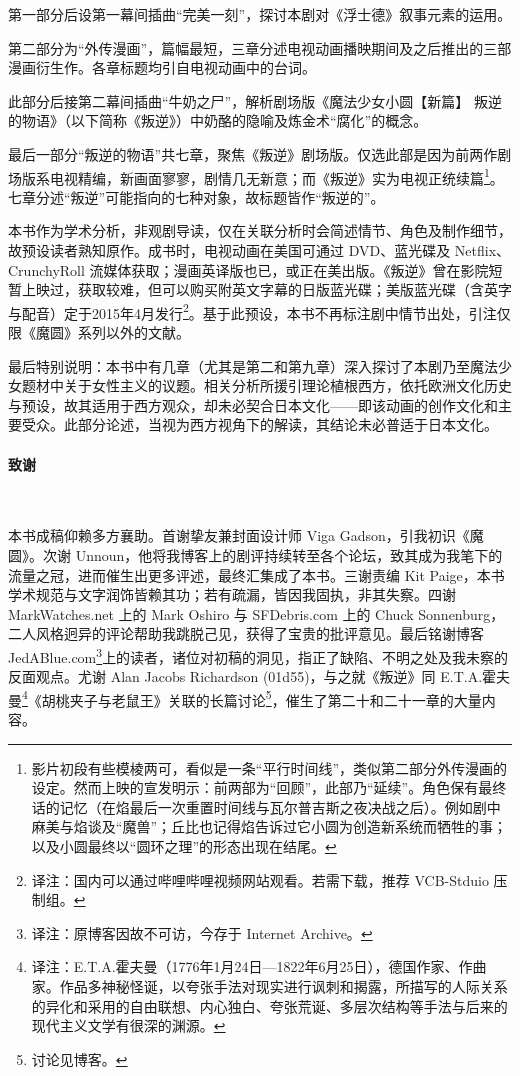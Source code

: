 第一部分后设第一幕间插曲“完美一刻”，探讨本剧对《浮士德》叙事元素的运用。

第二部分为“外传漫画”，篇幅最短，三章分述电视动画播映期间及之后推出的三部漫画衍生作。各章标题均引自电视动画中的台词。

此部分后接第二幕间插曲“牛奶之尸”，解析剧场版《魔法少女小圆【新篇】 叛逆的物语》（以下简称《叛逆》）中奶酪的隐喻及炼金术“腐化”的概念。

最后一部分“叛逆的物语”共七章，聚焦《叛逆》剧场版。仅选此部是因为前两作剧场版系电视精编，新画面寥寥，剧情几无新意；而《叛逆》实为电视正统续篇\footnote{影片初段有些模棱两可，看似是一条“平行时间线”，类似第二部分外传漫画的设定。然而上映的宣发明示：前两部为“回顾”，此部乃“延续”。角色保有最终话的记忆（在焰最后一次重置时间线与瓦尔普吉斯之夜决战之后）。例如剧中麻美与焰谈及“魔兽”；丘比也记得焰告诉过它小圆为创造新系统而牺牲的事；以及小圆最终以“圆环之理”的形态出现在结尾。}\cite{ref8}。七章分述“叛逆”可能指向的七种对象，故标题皆作“叛逆的\underline{\makebox[1cm]{}}”。

本书作为学术分析，非观剧导读，仅在关联分析时会简述情节、角色及制作细节，故预设读者熟知原作。成书时，电视动画在美国可通过 DVD、蓝光碟及 Netflix、CrunchyRoll 流媒体获取；漫画英译版也已，或正在美出版。《叛逆》曾在影院短暂上映过，获取较难，但可以购买附英文字幕的日版蓝光碟；美版蓝光碟（含英字与配音）定于2015年4月发行\footnote{译注：国内可以通过哔哩哔哩视频网站观看。若需下载，推荐 VCB-Stduio 压制组。}。基于此预设，本书不再标注剧中情节出处，引注仅限《魔圆》系列以外的文献。

最后特别说明：本书中有几章（尤其是第二和第九章）深入探讨了本剧乃至魔法少女题材中关于女性主义的议题。相关分析所援引理论植根西方，依托欧洲文化历史与预设，故其适用于西方观众，却未必契合日本文化——即该动画的创作文化和主要受众。此部分论述，当视为西方视角下的解读，其结论未必普适于日本文化。
\paragraph{致谢}~{}

本书成稿仰赖多方襄助。首谢挚友兼封面设计师 Viga Gadson，引我初识《魔圆》。次谢 Unnoun，他将我博客上的剧评持续转至各个论坛，致其成为我笔下的流量之冠，进而催生出更多评述，最终汇集成了本书。三谢责编 Kit Paige，本书学术规范与文字润饰皆赖其功；若有疏漏，皆因我固执，非其失察。四谢 MarkWatches.net 上的 Mark Oshiro 与 SFDebris.com 上的 Chuck Sonnenburg，二人风格迥异的评论帮助我跳脱己见，获得了宝贵的批评意见。最后铭谢博客 JedABlue.com\footnote{译注：原博客因故不可访，今存于 Internet Archive。}上的读者，诸位对初稿的洞见，指正了缺陷、不明之处及我未察的反面观点。尤谢 Alan Jacobs Richardson (01d55)，与之就《叛逆》同 E.T.A.霍夫曼\footnote{译注：E.T.A.霍夫曼（1776年1月24日—1822年6月25日），德国作家、作曲家。作品多神秘怪诞，以夸张手法对现实进行讽刺和揭露，所描写的人际关系的异化和采用的自由联想、内心独白、夸张荒诞、多层次结构等手法与后来的现代主义文学有很深的渊源。}《胡桃夹子与老鼠王》关联的长篇讨论\footnote{讨论见博客。}\cite{ref9}，催生了第二十和二十一章的大量内容。
